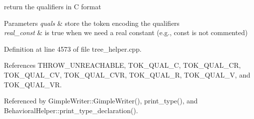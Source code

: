 return the qualifiers in C format 


\begin{DoxyParams}{Parameters}
{\em quals} & store the token encoding the qualifiers \\
\hline
{\em real\+\_\+const} & is true when we need a real constant (e.\+g., const is not commented) \\
\hline
\end{DoxyParams}


Definition at line 4573 of file tree\+\_\+helper.\+cpp.



References T\+H\+R\+O\+W\+\_\+\+U\+N\+R\+E\+A\+C\+H\+A\+B\+LE, T\+O\+K\+\_\+\+Q\+U\+A\+L\+\_\+C, T\+O\+K\+\_\+\+Q\+U\+A\+L\+\_\+\+CR, T\+O\+K\+\_\+\+Q\+U\+A\+L\+\_\+\+CV, T\+O\+K\+\_\+\+Q\+U\+A\+L\+\_\+\+C\+VR, T\+O\+K\+\_\+\+Q\+U\+A\+L\+\_\+R, T\+O\+K\+\_\+\+Q\+U\+A\+L\+\_\+V, and T\+O\+K\+\_\+\+Q\+U\+A\+L\+\_\+\+VR.



Referenced by Gimple\+Writer\+::\+Gimple\+Writer(), print\+\_\+type(), and Behavioral\+Helper\+::print\+\_\+type\+\_\+declaration().

